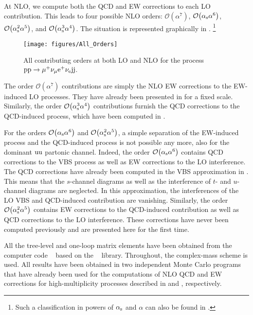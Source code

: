 \documentclass[a4article,11pt]{article}
\begin{document}
At NLO, we compute both the QCD and EW corrections to each LO
contribution.  This leads to four possible NLO orders:
$\mathcal{O}{\left(\alpha^{7}\right)}$,
$\mathcal{O}{\left(\alpha_\text{s}\alpha^{6}\right)}$,
$\mathcal{O}{\left(\alpha_\text{s}^{2}\alpha^{5}\right)}$, and
$\mathcal{O}{\left(\alpha_\text{s}^{3}\alpha^{4}\right)}$.  The situation is
represented graphically in .%
\footnote{Such a classification in
powers of $\alpha_\text{s}$ and $\alpha$ can also be found in
.}
%
\begin{figure}[t]
\begin{center}
          \texttt{[image: figures/All\_Orders]}
\end{center}
        \caption{All contributing orders at both LO and NLO for the process $\text{p}\text{p}\to\mu^+\nu_\mu\text{e}^+\nu_{\text{e}}\text{j}\text{j}$.}
\label{allorders}
\end{figure}
%
The order $\mathcal{O}{\left(\alpha^{7}\right)}$ contributions are
simply the NLO EW corrections to the EW-induced LO processes. They
have already been presented in  for a fixed
scale.  Similarly, the order $\mathcal{O}{\left(\alpha_{\rm
      s}^{3}\alpha^{4}\right)}$ contributions furnish the QCD
corrections to the QCD-induced process, which have been computed in
.


For the orders $\mathcal{O}{\left(\alpha_\text{s}\alpha^{6}\right)}$
and $\mathcal{O}{\left(\alpha_\text{s}^{2}\alpha^{5}\right)}$, a simple
separation of the EW-induced process and the QCD-induced process is not
possible any more, also for the dominant $\text{u}\text{u}$ 
partonic
channel.  Indeed,
the order $\mathcal{O}{\left(\alpha_\text{s}\alpha^{6}\right)}$
contains QCD corrections to the VBS process as well as EW corrections
to the LO interference.
The QCD corrections have already been
computed in the VBS approximation in
.
This means that the $s$-channel diagrams as well as the interference
of $t$- and $u$-channel diagrams are neglected.  In this
approximation, the interferences of the LO VBS and QCD-induced
contribution are vanishing.  Similarly, the order
$\mathcal{O}{\left(\alpha_\text{s}^{2}\alpha^{5}\right)}$ contains EW
corrections to the QCD-induced contribution as well as QCD corrections
to the LO interference.  These corrections have never been computed
previously and are presented here for the first time.

All the tree-level and one-loop matrix elements have been obtained
from the computer code \recola~\cite{Actis:2012qn,Actis:2016mpe} based
on the \collier~\cite{Denner:2014gla,Denner:2016kdg} library.
Throughout, the complex-mass scheme \cite{Denner:1999gp,Denner:2005fg}
is used.  All results have been obtained in two independent Monte
Carlo programs that have already been used for the computations of NLO
QCD and EW corrections for high-multiplicity processes described in
and
,
respectively.
\end{document}

